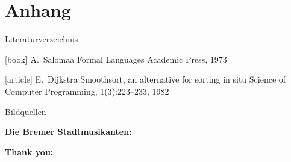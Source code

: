 \section{Anhang}
\begin{frame}{Literaturverzeichnis}
    \begin{thebibliography}{Längste Bezeichnung}
        [book]
            A.~Salomaa
            \newblock Formal Languages
            \newblock Academic Press, 1973

        [article]
            E.~Dijkstra
            \newblock Smoothsort, an alternative for sorting in situ
            \newblock Science of Computer Programming, 1(3):223--233, 1982
    \end{thebibliography}
\end{frame}

{
    \tiny
    \begin{frame}[allowframebreaks]{Bildquellen}
        \begin{minipage}{\textwidth}
            \textbf{Die Bremer Stadtmusikanten:} \\
        \end{minipage}
        \medskip

        \begin{minipage}{\textwidth}
            \textbf{Thank you:} \\
        \end{minipage}
    \end{frame}
}

